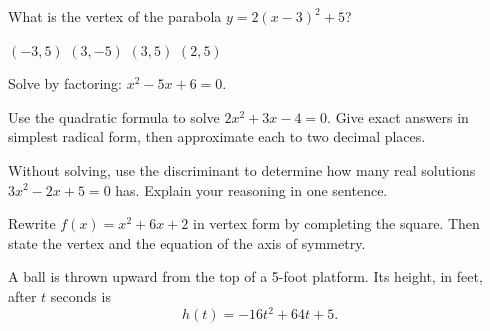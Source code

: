 \documentclass[11pt,addpoints]{exam}
\begin{document}
\begin{questions}

\question[2]
What is the vertex of the parabola $y = 2(x - 3)^2 + 5$?
\begin{oneparchoices}
  \choice $(-3, 5)$
  \choice $(3, -5)$
  \choice $(3, 5)$
  \choice $(2, 5)$
\end{oneparchoices}

\question[3]
Solve by factoring: $x^2 - 5x + 6 = 0$.
\vspace{2.5cm}

\question[4]
Use the quadratic formula to solve $2x^2 + 3x - 4 = 0$. Give exact answers in simplest radical form, then approximate each to two decimal places.
\vspace{3.5cm}

\question[3]
Without solving, use the discriminant to determine how many real solutions $3x^2 - 2x + 5 = 0$ has. Explain your reasoning in one sentence.
\vspace{2.5cm}

\question[4]
Rewrite $f(x) = x^2 + 6x + 2$ in vertex form by completing the square. Then state the vertex and the equation of the axis of symmetry.
\vspace{3cm}

\question
A ball is thrown upward from the top of a 5-foot platform. Its height, in feet, after $t$ seconds is
\[
  h(t) = -16t^2 + 64t + 5.
\]


\end{questions}
\end{document}
